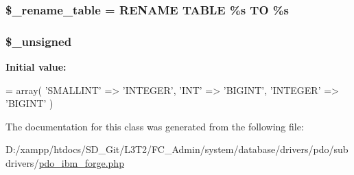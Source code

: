\subsubsection[{\$\+\_\+rename\+\_\+table}]{\setlength{\rightskip}{0pt plus 5cm}\$\+\_\+rename\+\_\+table = \textquotesingle{}R\+E\+N\+A\+M\+E T\+A\+B\+L\+E \%s T\+O \%s\textquotesingle{}\hspace{0.3cm}{\ttfamily [protected]}}\label{class_c_i___d_b__pdo__ibm__forge_a1a649e7cf9de16bcf932977b18bc91de}
\hypertarget{class_c_i___d_b__pdo__ibm__forge_aae977ae6d61fa183f0b25422b6ddc31c}{}
\subsubsection[{\$\+\_\+unsigned}]{\setlength{\rightskip}{0pt plus 5cm}\$\+\_\+unsigned\hspace{0.3cm}{\ttfamily [protected]}}\label{class_c_i___d_b__pdo__ibm__forge_aae977ae6d61fa183f0b25422b6ddc31c}
{\bfseries Initial value\+:}
\begin{DoxyCode}
= array(
        \textcolor{stringliteral}{'SMALLINT'}  => \textcolor{stringliteral}{'INTEGER'},
        \textcolor{stringliteral}{'INT'}       => \textcolor{stringliteral}{'BIGINT'},
        \textcolor{stringliteral}{'INTEGER'}   => \textcolor{stringliteral}{'BIGINT'}
    )
\end{DoxyCode}


The documentation for this class was generated from the following file\+:\begin{DoxyCompactItemize}
\item 
D\+:/xampp/htdocs/\+S\+D\+\_\+\+Git/\+L3\+T2/\+F\+C\+\_\+\+Admin/system/database/drivers/pdo/subdrivers/\hyperlink{pdo__ibm__forge_8php}{pdo\+\_\+ibm\+\_\+forge.\+php}\end{DoxyCompactItemize}
